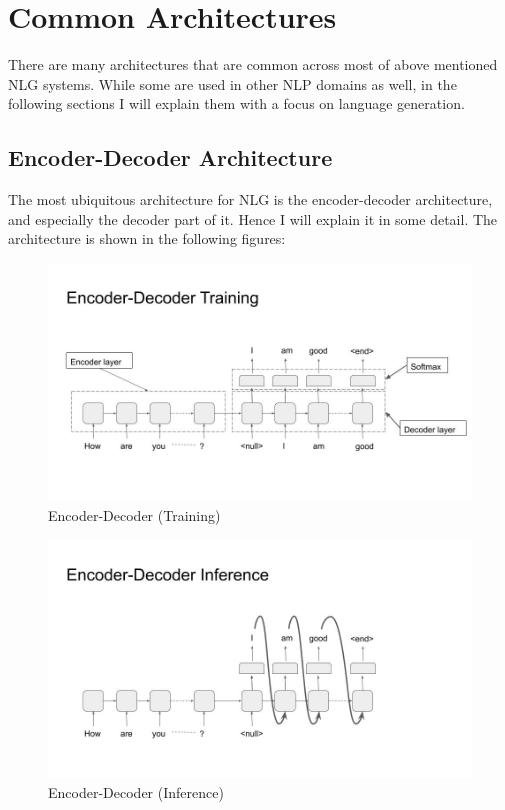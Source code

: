 \documentclass[]{krantz}
\begin{document}
\hypertarget{common-architectures}{%
\section{Common Architectures}\label{common-architectures}}

There are many architectures that are common across most of above mentioned NLG systems. While some are used in other NLP domains as well, in the following sections I will explain them with a focus on language generation.

\hypertarget{encoder-decoder-architecture-1}{%
\subsection{Encoder-Decoder Architecture}\label{encoder-decoder-architecture-1}}

The most ubiquitous architecture for NLG is the encoder-decoder architecture, and especially the decoder part of it. Hence I will explain it in some detail. The architecture is shown in the following figures:

\begin{figure}
\centering
\includegraphics{figures/04-01-use-case1/encoder_decoder_trg.jpg}
\caption{Encoder-Decoder (Training)}
\end{figure}

\begin{figure}
\centering
\includegraphics{figures/04-01-use-case1/encoder_decoder_inf.jpg}
\caption{Encoder-Decoder (Inference)}
\end{figure}
\end{document}
